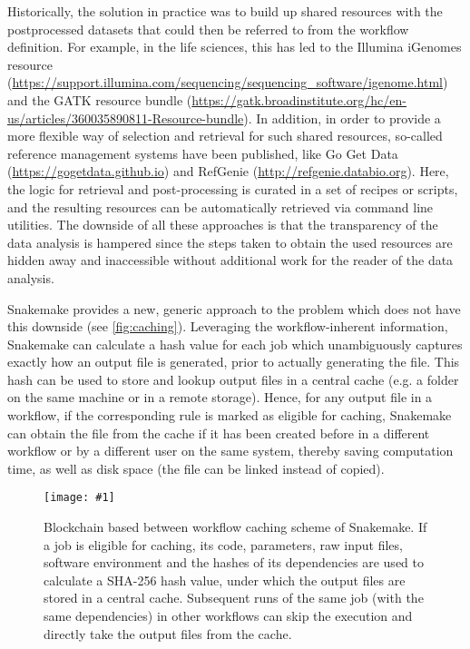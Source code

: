 \documentclass[parskip=half]{scrartcl}
\newcommand{\image}[1]{\centering\texttt{[image: \#1]}}
\let\plainurl\url
\renewcommand{\url}[1]{\protect\plainurl{#1}}
\begin{document}
Historically, the solution in practice was to build up shared resources with the postprocessed datasets that could then be referred to from the workflow definition.
For example, in the life sciences, this has led to the Illumina iGenomes resource (\url{https://support.illumina.com/sequencing/sequencing\_software/igenome.html}) and the GATK resource bundle (\url{https://gatk.broadinstitute.org/hc/en-us/articles/360035890811-Resource-bundle}).
In addition, in order to provide a more flexible way of selection and retrieval for such shared resources, so-called reference management systems have been published, like Go Get Data (\url{https://gogetdata.github.io}) and RefGenie (\url{http://refgenie.databio.org}).
Here, the logic for retrieval and post-processing is curated in a set of recipes or scripts, and the resulting resources can be automatically retrieved via command line utilities.
The downside of all these approaches is that the transparency of the data analysis is hampered since the steps taken to obtain the used resources are hidden away and inaccessible without additional work for the reader of the data analysis.

Snakemake provides a new, generic approach to the problem which does not have this downside (see \autoref{fig:caching}).
Leveraging the workflow-inherent information, Snakemake can calculate a hash value for each job which unambiguously captures exactly how an output file is generated, prior to actually generating the file.
This hash can be used to store and lookup output files in a central cache (e.g. a folder on the same machine or in a remote storage).
Hence, for any output file in a workflow, if the corresponding rule is marked as eligible for caching, Snakemake can obtain the file from the cache if it has been created before in a different workflow or by a different user on the same system, thereby saving computation time, as well as disk space (the file can be linked instead of copied).

\begin{figure}
	\image{caching.pdf}
	\caption{
		Blockchain based between workflow caching scheme of Snakemake.
		If a job is eligible for caching, its code, parameters, raw input files, software environment and the hashes of its dependencies are used to calculate a SHA-256 hash value, under which the output files are stored in a central cache.
		Subsequent runs of the same job (with the same dependencies) in other workflows can skip the execution and directly take the output files from the cache.
	}
	\label{fig:caching}
\end{figure}
\end{document}
